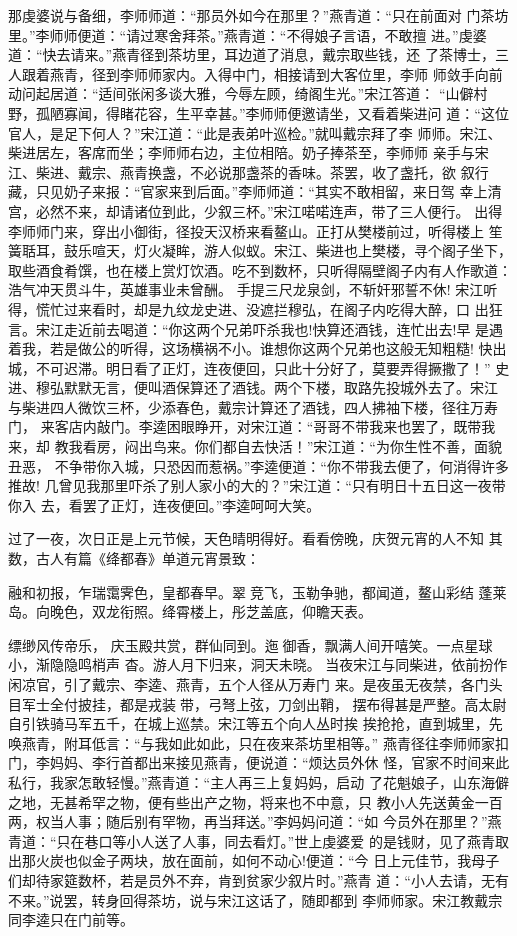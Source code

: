 那虔婆说与备细，李师师道：“那员外如今在那里？”燕青道：“只在前面对
门茶坊里。”李师师便道：“请过寒舍拜茶。”燕青道：“不得娘子言语，不敢擅
进。”虔婆道：“快去请来。”燕青径到茶坊里，耳边道了消息，戴宗取些钱，还
了茶博士，三人跟着燕青，径到李师师家内。入得中门，相接请到大客位里，李师
师敛手向前动问起居道：“适间张闲多谈大雅，今辱左顾，绮阁生光。”宋江答道：
“山僻村野，孤陋寡闻，得睹花容，生平幸甚。”李师师便邀请坐，又看着柴进问
道：“这位官人，是足下何人？”宋江道：“此是表弟叶巡检。”就叫戴宗拜了李
师师。宋江、柴进居左，客席而坐；李师师右边，主位相陪。奶子捧茶至，李师师
亲手与宋江、柴进、戴宗、燕青换盏，不必说那盏茶的香味。茶罢，收了盏托，欲
叙行藏，只见奶子来报：“官家来到后面。”李师师道：“其实不敢相留，来日驾
幸上清宫，必然不来，却请诸位到此，少叙三杯。”宋江喏喏连声，带了三人便行。
出得李师师门来，穿出小御街，径投天汉桥来看鳌山。正打从樊楼前过，听得楼上
笙簧聒耳，鼓乐喧天，灯火凝眸，游人似蚁。宋江、柴进也上樊楼，寻个阁子坐下，
取些酒食肴馔，也在楼上赏灯饮酒。吃不到数杯，只听得隔壁阁子内有人作歌道：
浩气冲天贯斗牛，英雄事业未曾酬。
手提三尺龙泉剑，不斩奸邪誓不休!
宋江听得，慌忙过来看时，却是九纹龙史进、没遮拦穆弘，在阁子内吃得大醉，口
出狂言。宋江走近前去喝道：“你这两个兄弟吓杀我也!快算还酒钱，连忙出去!早
是遇着我，若是做公的听得，这场横祸不小。谁想你这两个兄弟也这般无知粗糙!
快出城，不可迟滞。明日看了正灯，连夜便回，只此十分好了，莫要弄得撅撒了！”
史进、穆弘默默无言，便叫酒保算还了酒钱。两个下楼，取路先投城外去了。宋江
与柴进四人微饮三杯，少添春色，戴宗计算还了酒钱，四人拂袖下楼，径往万寿门，
来客店内敲门。李逵困眼睁开，对宋江道：“哥哥不带我来也罢了，既带我来，却
教我看房，闷出鸟来。你们都自去快活！”宋江道：“为你生性不善，面貌丑恶，
不争带你入城，只恐因而惹祸。”李逵便道：“你不带我去便了，何消得许多推故!
几曾见我那里吓杀了别人家小的大的？”宋江道：“只有明日十五日这一夜带你入
去，看罢了正灯，连夜便回。”李逵呵呵大笑。

过了一夜，次日正是上元节候，天色晴明得好。看看傍晚，庆贺元宵的人不知
其数，古人有篇《绛都春》单道元宵景致：

融和初报，乍瑞霭霁色，皇都春早。翠竞飞，玉勒争驰，都闻道，鳌山彩结
蓬莱岛。向晚色，双龙衔照。绛霄楼上，彤芝盖底，仰瞻天表。

缥缈风传帝乐，
庆玉殿共赏，群仙同到。迤御香，飘满人间开嘻笑。一点星球小，渐隐隐鸣梢声
杳。游人月下归来，洞天未晓。
当夜宋江与同柴进，依前扮作闲凉官，引了戴宗、李逵、燕青，五个人径从万寿门
来。是夜虽无夜禁，各门头目军士全付披挂，都是戎装带，弓弩上弦，刀剑出鞘，
摆布得甚是严整。高太尉自引铁骑马军五千，在城上巡禁。宋江等五个向人丛时挨
挨抢抢，直到城里，先唤燕青，附耳低言：“与我如此如此，只在夜来茶坊里相等。”
燕青径往李师师家扣门，李妈妈、李行首都出来接见燕青，便说道：“烦达员外休
怪，官家不时间来此私行，我家怎敢轻慢。”燕青道：“主人再三上复妈妈，启动
了花魁娘子，山东海僻之地，无甚希罕之物，便有些出产之物，将来也不中意，只
教小人先送黄金一百两，权当人事；随后别有罕物，再当拜送。”李妈妈问道：“如
今员外在那里？”燕青道：“只在巷口等小人送了人事，同去看灯。”世上虔婆爱
的是钱财，见了燕青取出那火炭也似金子两块，放在面前，如何不动心!便道：“今
日上元佳节，我母子们却待家筵数杯，若是员外不弃，肯到贫家少叙片时。”燕青
道：“小人去请，无有不来。”说罢，转身回得茶坊，说与宋江这话了，随即都到
李师师家。宋江教戴宗同李逵只在门前等。


